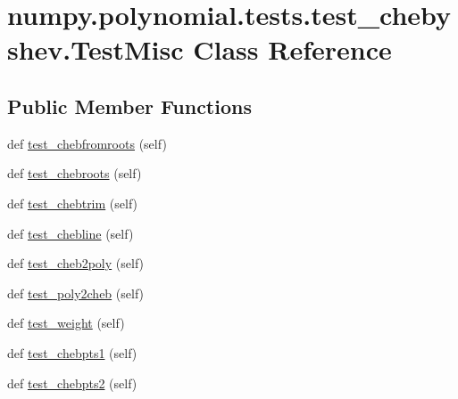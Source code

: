 \hypertarget{classnumpy_1_1polynomial_1_1tests_1_1test__chebyshev_1_1TestMisc}{}\section{numpy.\+polynomial.\+tests.\+test\+\_\+chebyshev.\+Test\+Misc Class Reference}
\label{classnumpy_1_1polynomial_1_1tests_1_1test__chebyshev_1_1TestMisc}
\subsection*{Public Member Functions}
\begin{DoxyCompactItemize}
\item 
def \hyperlink{classnumpy_1_1polynomial_1_1tests_1_1test__chebyshev_1_1TestMisc_aa49c9df8f6cf0fcf3c1795dbffe7bfaf}{test\+\_\+chebfromroots} (self)
\item 
def \hyperlink{classnumpy_1_1polynomial_1_1tests_1_1test__chebyshev_1_1TestMisc_afaf8ba95f44812a153dd55ce5d1e0890}{test\+\_\+chebroots} (self)
\item 
def \hyperlink{classnumpy_1_1polynomial_1_1tests_1_1test__chebyshev_1_1TestMisc_ad019554376f57a5925315a09cf989802}{test\+\_\+chebtrim} (self)
\item 
def \hyperlink{classnumpy_1_1polynomial_1_1tests_1_1test__chebyshev_1_1TestMisc_a0d0e893685d45336803dac433f41b3ff}{test\+\_\+chebline} (self)
\item 
def \hyperlink{classnumpy_1_1polynomial_1_1tests_1_1test__chebyshev_1_1TestMisc_a9991ff7c0ed4f800345324fb5593c189}{test\+\_\+cheb2poly} (self)
\item 
def \hyperlink{classnumpy_1_1polynomial_1_1tests_1_1test__chebyshev_1_1TestMisc_a8c8db35329808a53cfd8a9a29d9e1396}{test\+\_\+poly2cheb} (self)
\item 
def \hyperlink{classnumpy_1_1polynomial_1_1tests_1_1test__chebyshev_1_1TestMisc_af914d4592f8e554fa2d02b68ebdb50e4}{test\+\_\+weight} (self)
\item 
def \hyperlink{classnumpy_1_1polynomial_1_1tests_1_1test__chebyshev_1_1TestMisc_a8e755f05dc3bacd570a349f14b37efed}{test\+\_\+chebpts1} (self)
\item 
def \hyperlink{classnumpy_1_1polynomial_1_1tests_1_1test__chebyshev_1_1TestMisc_ad75ae174aa2a2d033aac42601dc80881}{test\+\_\+chebpts2} (self)
\end{DoxyCompactItemize}


